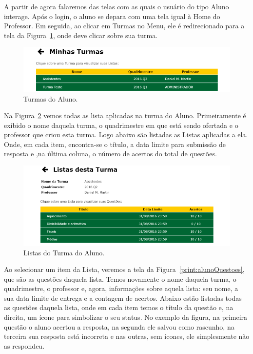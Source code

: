 \documentclass[
	12pt,				%
	openany,
	oneside,
	a4paper,			%
	english,			%
	brazil				%
	]{abntex2}
\begin{document}
  A partir de agora falaremos das telas com as quais o usuário do tipo Aluno interage. Após o login, o aluno se depara com uma tela igual à Home do Professor. Em seguida, ao clicar em Turmas no Menu, ele é redirecionado para a tela da Figura~\ref{print:alunoTurmas}, onde deve clicar sobre sua turma.
  
\begin{figure}[H]
  \centering
  \includegraphics[width=\textwidth]{prints/alunoTurmas.png}
  \caption{Turmas do Aluno.}
  \label{print:alunoTurmas}
  \vspace{-0.5cm}
\end{figure}

  Na Figura~\ref{print:alunoListas} vemos todas as lista aplicadas na turma do Aluno. Primeiramente é exibido o nome daquela turma, o quadrimestre em que está sendo ofertada e o professor que criou esta turma. Logo abaixo são listadas as Listas aplicadas a ela. Onde, em cada item, encontra-se o título, a data limite para submissão de resposta e ,na última coluna, o número de acertos do total de questões.

\begin{figure}[H]
  \centering
  \includegraphics[width=\textwidth]{prints/alunoListas.png}
  \caption{Listas do Turma do Aluno.}
  \label{print:alunoListas}
  \vspace{-0.5cm}
\end{figure}
  
  Ao selecionar um item da Lista, veremos a tela da Figura~\ref{print:alunoQuestoes}, que são as questões daquela lista. Temos novamente o nome daquela turma, o quadrimestre, o professor e, agora, informações sobre aquela lista: seu nome, a sua data limite de entrega e a contagem de acertos. Abaixo estão listadas todas as questões daquela lista, onde em cada item temos o título da questão e, na direita, um ícone para simbolizar o seu status. No exemplo da figura, na primeira questão o aluno acertou a resposta, na segunda ele salvou como rascunho, na terceira sua resposta está incorreta e nas outras, sem ícones, ele simplesmente não as respondeu.
  
\end{document}
